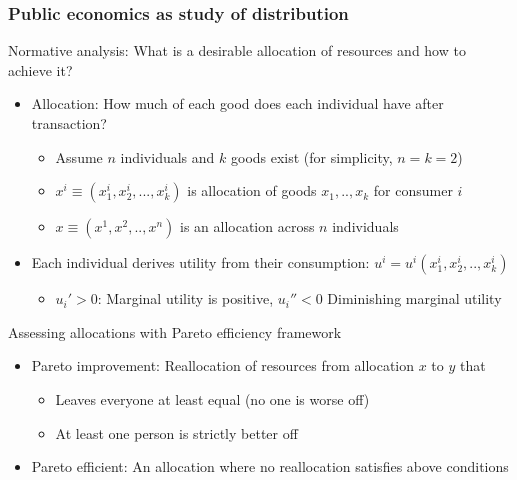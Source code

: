 \documentclass[aspectratio=169]{beamer}
\begin{document}
\begin{frame}
\frametitle{Public economics as study of distribution} 
Normative analysis: What is a desirable allocation of resources and how to achieve it?
\begin{itemize}\setlength\itemsep{3pt}
\item Allocation: How much of each good does each individual have after transaction?
\begin{itemize}\setlength\itemsep{3pt}
\item Assume $n$ individuals and $k$ goods exist (for simplicity, $n=k=2$)
\item $x^i \equiv (x_1^i, x_2^i,..., x_k^i)$ is allocation of goods $x_1,..,x_k$ for consumer $i$
\item $x\equiv (x^1,x^2,..,x^n)$ is an allocation across $n$ individuals
\end{itemize}
\item Each individual derives utility from their consumption: $u^i = u^i(x_1^i,x_2^i,..,x_k^i)$
 \begin{itemize}\setlength\itemsep{3pt}
\item $u_i'>0$: Marginal utility is positive, $u_i''<0$ Diminishing marginal utility
\end{itemize} 
\end{itemize}\medskip
Assessing allocations with Pareto efficiency framework
\begin{itemize}\setlength\itemsep{3pt}
\item Pareto improvement: Reallocation of resources from allocation $x$ to $y$ that 
\begin{itemize}\setlength\itemsep{3pt}
\item Leaves everyone at least equal (no one is worse off)
\item At least one person is strictly better off
\end{itemize}
\item Pareto efficient: An allocation where no reallocation satisfies above conditions 
\end{itemize}
\end{frame}
\end{document}

